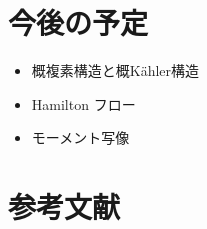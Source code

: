 \documentclass[report]{jlreq}
\begin{document}
%
%
%

%
\section*{今後の予定}

\begin{itemize}
    \item 概複素構造と概K\"ahler構造
    \item Hamilton フロー
    \item モーメント写像
\end{itemize}

%
\section*{参考文献}

\nocite{amari_information_2016}
\nocite{_bayes_2020}
\nocite{BB19061613}
\nocite{BA87914734}
\nocite{marsden_introduction_1999}

{
    \renewcommand{\bibsection}{}
    
    
}
\end{document}
